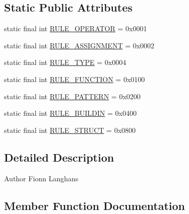 \subsection*{Static Public Attributes}
\begin{DoxyCompactItemize}
\item 
static final int \hyperlink{classfeder_1_1types_1_1FederRule_ac52e0e9fa01933aae9043c8db8c6756e}{R\+U\+L\+E\+\_\+\+O\+P\+E\+R\+A\+T\+OR} = 0x0001
\item 
static final int \hyperlink{classfeder_1_1types_1_1FederRule_a848abbbabef84c98beb5b83fcd8c5123}{R\+U\+L\+E\+\_\+\+A\+S\+S\+I\+G\+N\+M\+E\+NT} = 0x0002
\item 
static final int \hyperlink{classfeder_1_1types_1_1FederRule_a0299f2160aaab5b54997fb1c835bb034}{R\+U\+L\+E\+\_\+\+T\+Y\+PE} = 0x0004
\item 
static final int \hyperlink{classfeder_1_1types_1_1FederRule_ab1aceaccc1e229d42eb86de6cbeb7a7d}{R\+U\+L\+E\+\_\+\+F\+U\+N\+C\+T\+I\+ON} = 0x0100
\item 
static final int \hyperlink{classfeder_1_1types_1_1FederRule_a417762d710fd8cf2964d4ae67c6b054f}{R\+U\+L\+E\+\_\+\+P\+A\+T\+T\+E\+RN} = 0x0200
\item 
static final int \hyperlink{classfeder_1_1types_1_1FederRule_a1140c3933b8ad6b86b34a829bf243f52}{R\+U\+L\+E\+\_\+\+B\+U\+I\+L\+D\+IN} = 0x0400
\item 
static final int \hyperlink{classfeder_1_1types_1_1FederRule_aaacf50868fe27de3125ca4293915e1c2}{R\+U\+L\+E\+\_\+\+S\+T\+R\+U\+CT} = 0x0800
\end{DoxyCompactItemize}


\subsection{Detailed Description}
\begin{DoxyAuthor}{Author}
Fionn Langhans 
\end{DoxyAuthor}


\subsection{Member Function Documentation}
\mbox{\label{classfeder_1_1types_1_1FederRule_a3df175f196c684adb0ef4fa99a2599e0}} 
